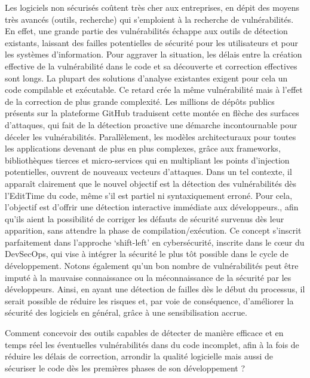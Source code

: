 Les logiciels non sécurisés coûtent très cher aux entreprises, en dépit des moyens très
avancés (outils, recherche) qui s’emploient à la recherche de vulnérabilités. En effet, une
grande partie des vulnérabilités échappe aux outils de détection existants, laissant des
failles potentielles de sécurité pour les utilisateurs et pour les systèmes d’information. Pour
aggraver la situation, les délais entre la création effective de la vulnérabilité dans le code et
sa découverte et correction effectives sont longs. La plupart des solutions d’analyse
existantes exigent pour cela un code compilable et exécutable. Ce retard crée la même
vulnérabilité mais à l’effet de la correction de plus grande complexité.
Les millions de dépôts publics présents sur la plateforme GitHub traduisent cette montée en
flèche des surfaces d’attaques, qui fait de la détection proactive une démarche
incontournable pour déceler les vulnérabilités. Parallèlement, les modèles architecturaux
pour toutes les applications devenant de plus en plus complexes, grâce aux frameworks,
bibliothèques tierces et micro-services qui en multipliant les points d’injection potentielles,
ouvrent de nouveaux vecteurs d’attaques.
Dans un tel contexte, il apparaît clairement que le nouvel objectif est la détection des
vulnérabilités dès l’EditTime du code, même s’il est partiel ni syntaxiquement erroné. Pour
cela, l’objectif est d’offrir une détection interactive immédiate aux développeurs., afin qu’ils
aient la possibilité de corriger les défauts de sécurité survenus dès leur apparition, sans
attendre la phase de compilation/exécution.
Ce concept s’inscrit parfaitement dans l’approche ‘shift-left’ en cybersécurité, inscrite dans le
cœur du DevSecOps, qui vise à intégrer la sécurité le plus tôt possible dans le cycle de
développement. Notons également qu’un bon nombre de vulnérabilités peut être imputé à la
mauvaise connaissance ou la méconnaissance de la sécurité par les développeurs. Ainsi,
en ayant une détection de failles dès le début du processus, il serait possible de réduire les
risques et, par voie de conséquence, d’améliorer la sécurité des logiciels en général, grâce à
une sensibilisation accrue.
    \begin{center}Comment concevoir des outils capables de détecter de manière efficace et en
    temps
    réel les
éventuelles vulnérabilités dans du code incomplet, afin à la fois de réduire les délais de
correction, arrondir la qualité logicielle mais aussi de sécuriser le code dès les premières
phases de son développement ?\end{center}

